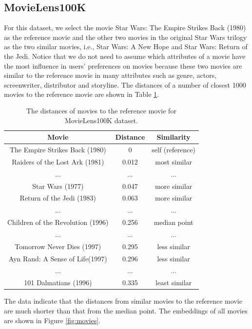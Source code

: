\documentclass[conference]{IEEEtran}
\begin{document}
\subsection{MovieLens100K}
For this dataset, we select the movie Star Wars: The Empire Strikes Back (1980) as the reference movie and the other two movies in the original Star Wars trilogy as the two similar movies, i.e., Star Wars: A New Hope and Star Wars: Return of the Jedi.
Notice that we do not need to assume which attributes of a movie have the most influence in users' preferences on movies because these two movies are similar to the reference movie in many attributes such as genre, actors, screenwriter, distributor and storyline.
The distances of a number of closest 1000 movies to the reference movie are shown in Table \ref{tab:movielens100k-distance}.
\begin{table}[!ht]
	\centering
	\caption{
		The distances of movies to the reference movie for MovieLens100K dataset.
	}
	\begin{tabular}{ccc} \hline \rowcolor{blue!30}
		Movie & Distance & Similarity \\ \hline
		The Empire Strikes Back (1980) & 0 & self (reference) \\ \hline
		Raiders of the Lost Ark (1981) & 0.012 & most similar \\ \hline
		... & ... & ... \\ \hline
		Star Wars (1977) & 0.047 & more similar \\ \hline
		Return of the Jedi (1983) & 0.063 & more similar \\ \hline
		... & ... & ... \\ \hline
		Children of the Revolution (1996) & 0.256 & median point \\ \hline
		... & ... & ... \\ \hline
		Tomorrow Never Dies (1997) & 0.295 & less similar \\ \hline
		Ayn Rand: A Sense of Life(1997) & 0.296 & less similar \\ \hline
		... & ... & ... \\ \hline
		101 Dalmatians (1996) & 0.335 & least similar \\ \hline
	\end{tabular}
	\label{tab:movielens100k-distance}
\end{table}
The data indicate that the distances from similar movies to the reference movie are much shorter than that from the median point.
The embeddings of all movies are shown in Figure \ref{fig:movies}.
\end{document}
